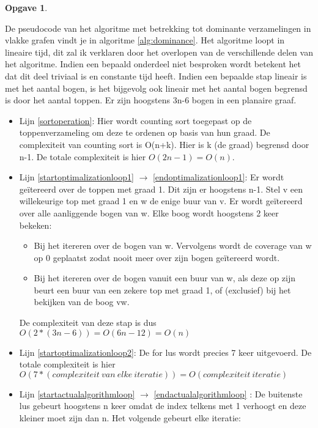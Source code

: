 \documentclass[11pt, a4paper, table]{article}
\makeatletter
\newenvironment{algoritme}[1][H]{%
	\renewcommand{\ALG@name}{Algoritme}%
	\renewcommand{\algorithmicrequire}{\textbf{Input:}}
	\renewcommand{\algorithmicensure}{\textbf{Output:}}
	\begin{algorithm}[#1]%
	}{\end{algorithm}}
\theoremstyle{definition}
\newtheorem{opgave}{Opgave}
\theoremstyle{definition}
\theoremstyle{definition}
\makeatother
\begin{document}
\begin{opgave}
\begin{tcolorbox}[blanker,float=tbp, grow to left by=2cm,grow to right by=2cm]
\begin{algoritme}
\begin{algorithmic}[1]
			\end{algorithmic}
		\end{algoritme}
		\end{tcolorbox}

		De pseudocode van het algoritme met betrekking tot dominante verzamelingen in vlakke grafen vindt je in algoritme \ref{alg:dominance}. Het algoritme loopt in lineaire tijd, dit zal ik verklaren door het overlopen van de verschillende delen van het algoritme. Indien een bepaald onderdeel niet besproken wordt betekent het dat dit deel triviaal is en constante tijd heeft. Indien een bepaalde stap lineair is met het aantal bogen, is het bijgevolg ook lineair met het aantal bogen begrensd is door het aantal toppen. Er zijn hoogstens 3n-6 bogen in een planaire graaf. 
		\begin{itemize}
			 \item Lijn \ref{sortoperation}: Hier wordt counting sort toegepast op de toppenverzameling om deze te ordenen op basis van hun graad. De complexiteit van counting sort is O(n+k). Hier is k (de graad) begrensd door n-1. De totale complexiteit is hier $O(2n-1)=O(n)$.
			 \item Lijn \ref{startoptimalizationloop1} $\rightarrow$ \ref{endoptimalizationloop1}: Er wordt ge\"{i}tereerd over de toppen met graad 1. Dit zijn er hoogstens n-1. 
			 Stel v een willekeurige top met graad 1 en w de enige buur van v.
			 Er wordt ge\"{i}tereerd over alle aanliggende bogen van w. Elke boog wordt hoogstens 2 keer bekeken:
			 \begin{itemize}
			 	\item Bij het itereren over de bogen van w. Vervolgens wordt de coverage van w op 0 geplaatst zodat nooit meer over zijn bogen ge\"{i}tereerd wordt. 
			 	\item Bij het itereren over de bogen vanuit een buur van w, als deze op zijn beurt een buur van een zekere top met graad 1, of (exclusief) bij het bekijken van de boog vw. 
			 \end{itemize}
			 De complexiteit van deze stap is dus $O(2*(3n-6)) = O(6n-12) = O(n)$
			\item Lijn \ref{startoptimalizationloop2}: De for lus wordt precies 7 keer uitgevoerd. De totale complexiteit is hier 
			$O(7*(complexiteit\ van\ elke\ iteratie)) = O(complexiteit \ iteratie)$
			\item Lijn \ref{startactualalgorithmloop} $\rightarrow$ \ref{endactualalgorithmloop} : De buitenste lus gebeurt hoogstens n keer omdat de index telkens met 1 verhoogt en deze kleiner moet zijn dan n. Het volgende gebeurt elke iteratie: 

\end{itemize}
\end{opgave}
\end{document}
